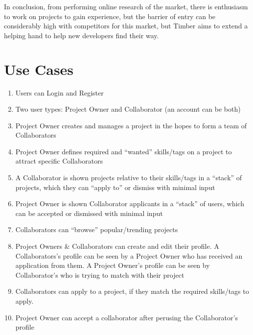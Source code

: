 \documentclass[a4paper,11pt]{report}
\begin{document}
In conclusion, from performing online research of the market, there is
enthusiasm to work on projects to gain experience, but the  barrier of entry can
be considerably high with competitors for this market, but Timber aims to extend
a helping hand to help new developers find their way.

\chapter{Use Cases}
\begin{enumerate}
    \item Users can Login and Register
    \item Two user types: Project Owner and Collaborator (an account can be both)
    \item Project Owner creates and manages a project in the hopes to form a
    team of Collaborators

    \item Project Owner defines required and “wanted” skills/tags on a project
    to attract specific Collaborators

    \item A Collaborator is shown projects relative to their skills/tags in a
    “stack” of projects, which they can “apply to” or dismiss with minimal input
    \item Project Owner is shown Collaborator applicants in a “stack” of users,
    which can be accepted or dismissed with minimal input

    \item Collaborators can “browse” popular/trending projects

    \item Project Owners \& Collaborators can create and edit their profile. A
    Collaborators’s profile can be seen by a Project Owner who has received an
    application from them. A Project Owner’s profile can be seen by
    Collaborator’s who is trying to match with their project

    \item Collaborators can apply to a project, if they match the required
    skills/tags to apply.

    \item Project Owner can accept a collaborator after perusing the Collaborator’s profile
\end{enumerate}
\end{document}
